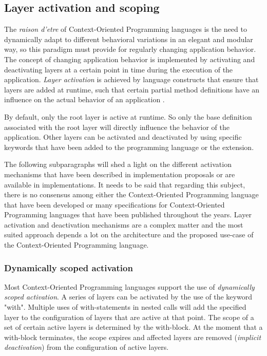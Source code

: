 \documentclass{acm_proc_article-sp}
\begin{document}
\subsection{Layer activation and scoping}
\label{sec:layer_activation_scoping}
The \textit{raison d'etre} of Context-Oriented Programming languages is the need to dynamically adapt to different behavioral variations in an elegant and modular way, so this paradigm must provide for regularly changing application behavior. The concept of changing  application behavior is implemented by activating and deactivating layers at a certain point in time during the execution of the application. \textit{Layer activation} is achieved by language constructs that ensure that layers are added at runtime, such that certain partial method definitions have an influence on the actual behavior of an application \cite{Kamina:2014:CSE:2577080.2579816}. 

By default, only the root layer is active at runtime. So only the base definition associated with the root layer will directly influence the behavior of the application. Other layers can be activated and deactivated by using specific keywords that have been added to the programming language or the extension. 

The following subparagraphs will shed a light on the different activation mechanisms that have been described in implementation proposals or are available in implementations. It needs to be said that regarding this subject, there is no consensus among either the Context-Oriented Programming language that have been developed or many specifications for Context-Oriented Programming languages that have been published throughout the years. Layer activation and deactivation mechanisms are a complex matter and the most suited approach depends a lot on the architecture and the proposed use-case of the Context-Oriented Programming language.

\subsubsection{Dynamically scoped activation}
\label{dynamically_scoped_activation}
Most Context-Oriented Programming languages support the use of \textit{dynamically scoped activation}. A series of layers can be activated by the use of the keyword "with". Multiple uses of with-statements in nested calls will add the specified layer to the configuration of layers that are active at that point. The scope of a set of certain active layers is determined by the with-block. At the moment that a with-block terminates, the scope expires and affected layers are removed (\textit{implicit deactivation}) from the configuration of active layers. 
\end{document}
